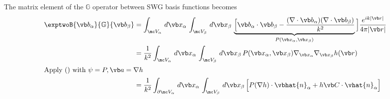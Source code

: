 \documentclass[letterpaper]{article}
\begin{document}
The matrix element of the $\mathbb{G}$ operator between
SWG basis functions becomes 
\begin{align*}
  \exptwoB{\vb b_\alpha}{\mathbb{G}}{\vb b_\beta}
&=
 \int_{\mc V_\alpha}\,d\vb x_\alpha\,
 \int_{\mc V_\beta}\,d\vb x_\beta\,
 \underbrace{
 \Big[\vb b_\alpha \cdot \vb b_\beta 
          -\frac{ (\nabla \cdot \vb b_\alpha)
                  (\nabla \cdot \vb b_\beta)
                }{k^2}
            }_{P(\vb x_\alpha, \vb x_\beta)}
 \Big] \frac{e^{ik|\vb r|}}{4\pi |\vb r|}
\\
&=\frac{1}{k^2}
 \int_{\mc V_\alpha}\,d\vb x_\alpha\,
 \int_{\mc V_\beta}\,d\vb x_\beta\,
 P(\vb x_\alpha, \vb x_\beta)
 \nabla_{\vb x_\alpha} \nabla_{\vb x_\beta} 
 h(\vb r)
\\
\intertext{Apply () with $\psi=P, \vb a = \nabla h$}
&=\frac{1}{k^2}
 \int_{\partial \mc V_\alpha}\,d\vb x_\alpha\,
 \int_{\mc V_\beta}\,d\vb x_\beta\,
  \Big[  P (\nabla h)\cdot \vbhat{n}_\alpha
       + h \vb C \cdot \vhat{n}_\alpha
  \Big]
\end{align*}
\end{document}
